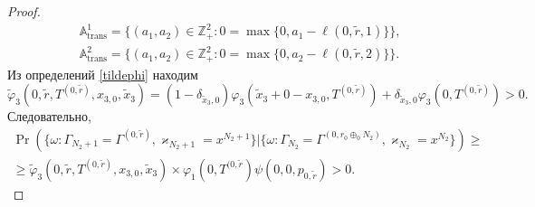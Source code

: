 \documentclass{report}
\begin{document}
\begin{proof}
\begin{align*}
&{\mathbb A}_{\mathrm{trans}}^1 = \{(a_1,a_2) \in \mathbb{Z}_+^2 \colon 0=\max{\{0,a_1-\ell(0,\tilde{r},1)\}}\},\\
 &{\mathbb A}_{\mathrm{trans}}^2= \{(a_1,a_2) \in \mathbb{Z}_+^2 \colon  0=\max{\{0,a_2-\ell(0,\tilde{r},2)\}}\}.
\end{align*}
Из определений \eqref{tildephi} находим
\begin{equation*}
\widetilde{\varphi}_3(0,\tilde{r},T^{(0,\tilde{r})},x_{3,0},\tilde{x}_3)= (1-\delta_{\tilde{x}_3,0}) \varphi_3(\tilde{x}_3 + 0 - x_{3,0},T^{(0,\tilde{r})} ) + \delta_{\tilde{x}_3,0} \varphi_3(0,T^{(0,\tilde{r})}) > 0.
\end{equation*}
Следовательно, 
\begin{multline*}
\Pr (\{\omega\colon\Gamma_{N_2+1}=\Gamma^{(0,\tilde{r})},\varkappa_{N_2+1}=x^{N_2+1} \}| \{\omega\colon\Gamma_{N_2}=\Gamma^{(0,r_0\oplus_{0}N_2)},\varkappa_{N_2}=x^{N_2}\})\geqslant\\
\geqslant \widetilde{\varphi}_3(0,\tilde{r},T^{(0,\tilde{r})},x_{3,0},\tilde{x}_3)
\times
\varphi_1(0,T^{(0,\tilde{r}}) \psi(0,0, p_{0,\tilde{r}}) > 0.
\end{multline*}


\end{proof}
\end{document}
